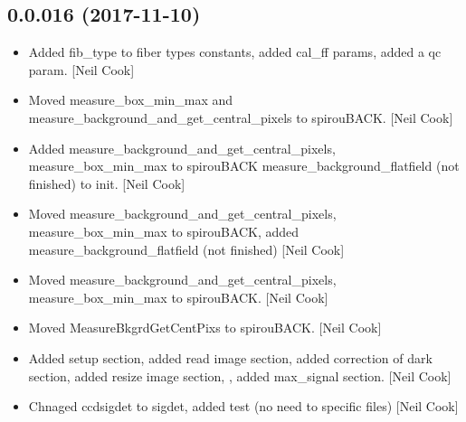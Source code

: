 \documentclass[a4paper,10pt,english]{report}
\begin{document}
\subsection{0.0.016 (2017-11-10)}
\label{\detokenize{misc/changelog:id533}}\begin{itemize}
\item {} 
Added fib\_type to fiber types constants, added cal\_ff params, added a
qc param. {[}Neil Cook{]}

\item {} 
Moved measure\_box\_min\_max and
measure\_background\_and\_get\_central\_pixels to spirouBACK. {[}Neil Cook{]}

\item {} 
Added measure\_background\_and\_get\_central\_pixels, measure\_box\_min\_max
to spirouBACK measure\_background\_flatfield (not finished) to init.
{[}Neil Cook{]}

\item {} 
Moved measure\_background\_and\_get\_central\_pixels, measure\_box\_min\_max
to spirouBACK, added measure\_background\_flatfield (not finished) {[}Neil
Cook{]}

\item {} 
Moved measure\_background\_and\_get\_central\_pixels, measure\_box\_min\_max
to spirouBACK. {[}Neil Cook{]}

\item {} 
Moved MeasureBkgrdGetCentPixs to spirouBACK. {[}Neil Cook{]}

\item {} 
Added setup section, added read image section, added correction of
dark section, added resize image section, , added max\_signal section.
{[}Neil Cook{]}

\item {} 
Chnaged ccdsigdet to sigdet, added test (no need to specific files)
{[}Neil Cook{]}

\end{itemize}
\end{document}
